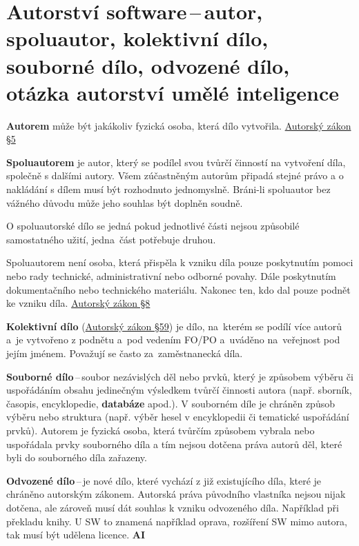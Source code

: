 \newpage
\section{Autorství software\,--\,autor, spoluautor, kolektivní dílo, souborné dílo, odvozené dílo, otázka autorství umělé inteligence}
\textbf{Autorem} může být jakákoliv fyzická osoba, která dílo vytvořila. \href{https://www.zakonyprolidi.cz/cs/2000-121#p5}{Autorský zákon §5}

\textbf{Spoluautorem} je autor, který se podílel svou tvůrčí činností na vytvoření díla, společně s dalšími autory. Všem zúčastněným autorům připadá stejné právo a o nakládání s dílem musí být rozhodnuto jednomyslně. Bráni-li spoluautor bez vážného důvodu může jeho souhlas být doplněn soudně.

O spoluautorské dílo se jedná pokud jednotlivé části nejsou způsobilé samostatného užití, jedna~část potřebuje druhou.

Spoluautorem není osoba, která přispěla k vzniku díla pouze poskytnutím pomoci nebo rady technické, administrativní nebo odborné povahy. Dále poskytnutím dokumentačního nebo technického materiálu. Nakonec ten, kdo dal pouze podnět ke vzniku díla. \href{https://www.zakonyprolidi.cz/cs/2000-121#p8}{Autorský zákon §8}

\textbf{Kolektivní dílo} (\href{https://www.zakonyprolidi.cz/cs/2000-121#p59}{Autorský zákon §59}) je dílo, na~kterém se podílí více autorů a~je vytvořeno z podnětu a~pod vedením FO/PO a~uváděno na~veřejnost pod jejím jménem. Považují se často za~zaměstnanecká díla.

\textbf{Souborné dílo}\,--\,soubor nezávislých děl nebo prvků, který je způsobem výběru či uspořádáním obsahu jedinečným výsledkem tvůrčí činnosti autora (např. sborník, časopis, encyklopedie, \textbf{databáze} apod.). V souborném díle je chráněn způsob výběru nebo struktura (např. výběr hesel v encyklopedii či tematické uspořádání prvků). Autorem je fyzická osoba, která tvůrčím způsobem vybrala nebo uspořádala prvky souborného díla a tím nejsou dotčena práva autorů děl, které byli do souborného díla zařazeny. 

\textbf{Odvozené dílo}\,--\,je nové dílo, které vychází z již existujícího díla, které je chráněno autorským zákonem. Autorská práva původního vlastníka nejsou nijak dotčena, ale zároveň musí dát souhlas k vzniku odvozeného díla. Například při překladu knihy. U SW to znamená například oprava, rozšíření SW mimo autora, tak musí být udělena licence.
\vspace{1cm}
\noindent\textbf{AI}

